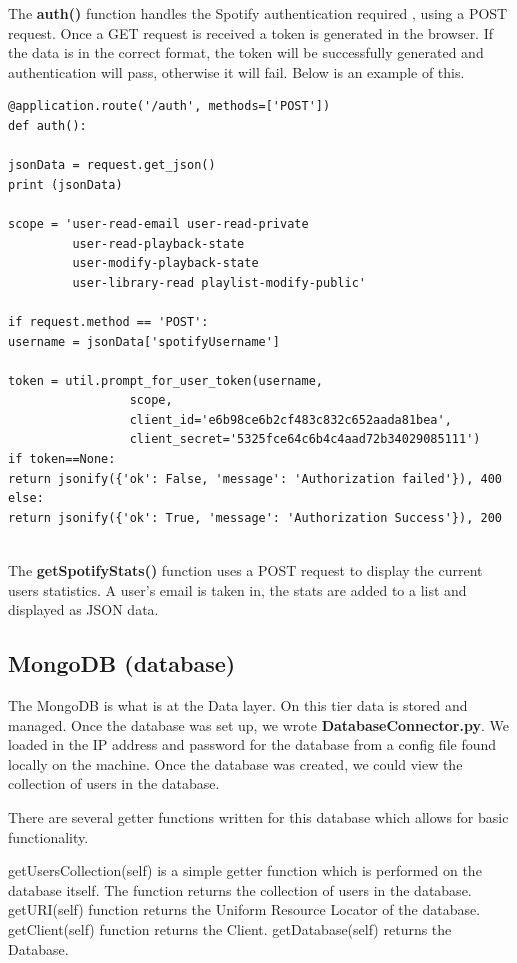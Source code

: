 The \textbf{auth()} function handles the Spotify authentication required , using a POST request. Once a GET request is received a token is generated in the browser. If the data is in the correct format, the token will be successfully generated and authentication will pass, otherwise it will fail.\newline
Below is an example of this.\newline
\begin{verbatim}
@application.route('/auth', methods=['POST'])
def auth():

jsonData = request.get_json()
print (jsonData)

scope = 'user-read-email user-read-private 
         user-read-playback-state 
         user-modify-playback-state 
         user-library-read playlist-modify-public'

if request.method == 'POST':
username = jsonData['spotifyUsername']

token = util.prompt_for_user_token(username,
                 scope,
                 client_id='e6b98ce6b2cf483c832c652aada81bea',
                 client_secret='5325fce64c6b4c4aad72b34029085111')
if token==None:
return jsonify({'ok': False, 'message': 'Authorization failed'}), 400
else:
return jsonify({'ok': True, 'message': 'Authorization Success'}), 200


\end{verbatim}


The \textbf{getSpotifyStats()} function uses a POST request to display the current users statistics. A user’s email is taken in, the stats are added to a list and displayed as JSON data.\newline


\subsection{MongoDB (database)}
The MongoDB is what is at the Data layer. On this tier data is stored and managed.\cite{MongoDBDocumentation} Once the database was set up, we wrote \textbf{DatabaseConnector.py}. We loaded in the IP address and password for the database from a config file found locally on the machine. Once the database was created, we could view the collection of users in the database.\newline

There are several getter functions written for this database which allows for basic functionality.

getUsersCollection(self) is a simple getter function which is performed on the database itself. The function returns the collection of users in the database.
getURI(self) function returns the Uniform Resource Locator of the database.
getClient(self) function returns the Client.
getDatabase(self) returns the Database.\newline

